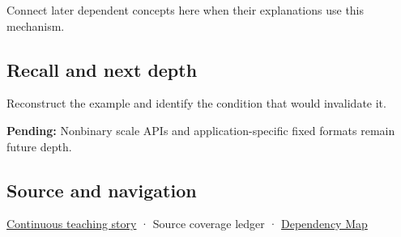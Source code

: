 Connect later dependent concepts here when their explanations use this mechanism.

\subsection{Recall and next depth}\label{appendix-1d0dbe8924cc-recall-and-next-depth}

Reconstruct the example and identify the condition that would invalidate it.

\textbf{Pending:} Nonbinary scale APIs and application-specific fixed formats remain future depth.

\subsection{Source and navigation}\label{appendix-1d0dbe8924cc-source-and-navigation}

\hyperref[01-foundations-i-ch001-choosing-what-information-to-keep]{Continuous teaching story} · {Source coverage ledger} · \hyperref[appendix-4ad47bdd269a]{Dependency Map}

